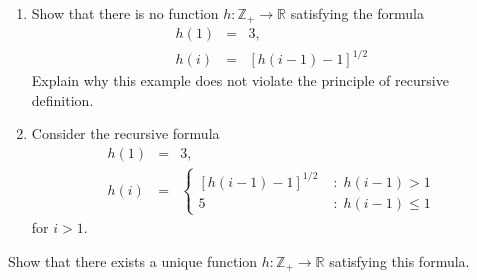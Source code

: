 \documentclass[a4paper,12pt]{article}
\begin{document}
\begin{exe}\leavevmode \par
	\begin{enumerate}
		\item
		      Show that there is no function \( h:\mathbb{Z}_{+} \to \mathbb{R} \)
		      satisfying the formula
		      \begin{eqnarray*}
			      h(1)&=&3,\\
			      h(i)&=& \left[ h(i-1)-1 \right]^{1/2}
		      \end{eqnarray*}
		      Explain why this example does not violate the principle of recursive definition.
		      
		\item
		      Consider the recursive formula
		      \begin{eqnarray*}
			      h(1)&=&3,\\
			      h(i)&=& \begin{cases}
				      \left[ h(i-1)-1 \right]^{1/2} & \;\mathrm{:}\; h(i-1)>1    \\
				      5                             & \;\mathrm{:}\; h(i-1)\le 1
			      \end{cases}
		      \end{eqnarray*}
		      for \( i>1 \).
	\end{enumerate}
	Show that there exists a unique function
	\( h:\mathbb{Z}_{+} \to \mathbb{R} \)
	satisfying this formula.
\end{exe}
\end{document}
